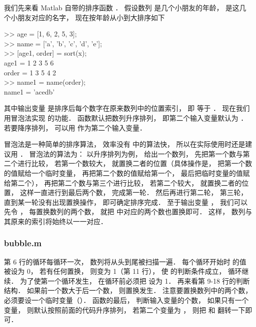 

我们先来看 Matlab 自带的排序函数 ． 假设数列  是几个小朋友的年龄，  是这几个小朋友对应的名字， 现在按年龄从小到大排序如下
\begin{Command}
>> age = [1, 6, 2, 5, 3];\\
>> name = ['a', 'b', 'c', 'd', 'e'];\\
>> [age1, order] = sort(x);\\
age1 = 1 2 3 5 6\\
order = 1 3 5 4 2\\
>> name1 = name(order);\\
name1 = 'acedb'
\end{Command}
其中输出变量  是排序后每个数字在原来数列中的位置索引， 即  等于 ． 现在我们用冒泡法实现  的功能．  函数默认把数列升序排列， 即第二个输入变量默认为 ． 若要降序排列， 可以用  作为第二个输入变量．

冒泡法是一种简单的排序算法， 效率没有  中的算法快， 所以在实际使用时还是建议用 ． 冒泡法的算法为： 以升序排列为例， 给出一个数列， 先把第一个数与第二个进行比较， 若第一个数较大， 就置换二者的位置（具体操作是， 把第一个数的值赋给一个临时变量， 再把第二个数的值赋给第一个， 最后把临时变量的值赋给第二个）， 再把第二个数与第三个进行比较， 若第二个较大， 就置换二者的位置， 这样一直进行到最后两个数， 完成第一轮． 然后再进行第二轮， 第三轮， 直到某一轮没有出现置换操作， 即可确定排序完成． 至于输出变量 ， 我们可以先令 ， 每置换数列的两个数， 就把  中对应的两个数也置换即可． 这样， 数列与其原来的索引将始终以一一对应． 

\subsubsection{bubble.m}


第 6 行的循环每循环一次， 数列将从头到尾被扫描一遍． 每个循环开始时  的值被设为 0， 若有任何置换，  则变为 1（第 11 行）， 使  的判断条件成立， 循环继续． 为了使第一个循环发生， 在循环前必须把  设为 1． 再来看第 9-18 行的判断结构． 如果前一个数大于后一个数， 则置换发生． 注意要置换数列中的两个数， 必须要设一个临时变量（）． 函数的最后， 判断输入变量的个数， 如果只有一个变量， 则默认按照前面的代码升序排列， 若第二个变量为 ， 则把  和  翻转一下即可．